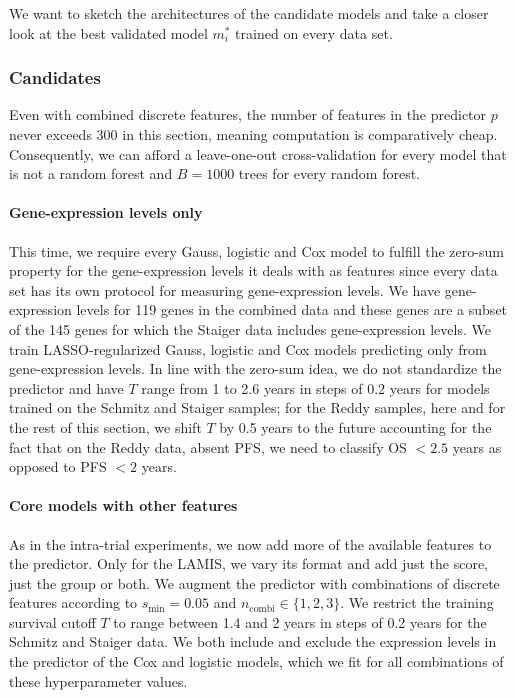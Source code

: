 We want to sketch the architectures of the candidate models and take a closer look at the 
best validated model $m_i^*$ trained on every data set.

\subsubsection{Candidates}

Even with combined discrete features, the number of features in the predictor $p$ 
never exceeds \num{300} in this section, meaning computation is comparatively cheap. 
Consequently, we can afford 
a leave-one-out cross-validation for every model that is not a random forest and $B = \num{1000}$ 
trees for every random forest.

\paragraph{Gene-expression levels only}
This time, we require every Gauss, logistic and Cox model to fulfill the zero-sum property for 
the gene-expression levels it deals with as features since every data set has its own protocol for 
measuring gene-expression levels. We have gene-expression levels for \num{119} genes in the 
combined data and these genes are a subset of the \num{145} genes for which the Staiger data 
includes gene-expression levels. We train LASSO-regularized Gauss, 
logistic and Cox models predicting only from gene-expression levels. In line with the zero-sum 
idea, we do not standardize the predictor and have $T$ range from \num{1} to \num{2.6} years in 
steps of \num{0.2} years for models trained on the Schmitz and Staiger samples; for the Reddy 
samples, here and for the rest of this section, we shift $T$ by
\num{0.5} years to the future accounting for the fact that on the Reddy data, absent PFS, we need 
to classify OS $< \num{2.5}$ years as opposed to PFS $< \num{2}$ years.

\paragraph{Core models with other features}
As in the intra-trial experiments, we now add more of the available features to the predictor. Only 
for the LAMIS, we vary its format and add just the score, just the group or both. We augment the 
predictor with combinations of discrete features according to $s_\text{min} = \num{0.05}$ and 
$n_\text{combi} \in \{ 1, 2, 3 \}$. We restrict the training survival cutoff $T$ to range between 
\num{1.4} and \num{2} years in steps of \num{0.2} years for the Schmitz and Staiger data. We 
both include and exclude the expression levels in the predictor of the Cox and logistic 
models, which we fit for all combinations of these hyperparameter values.

